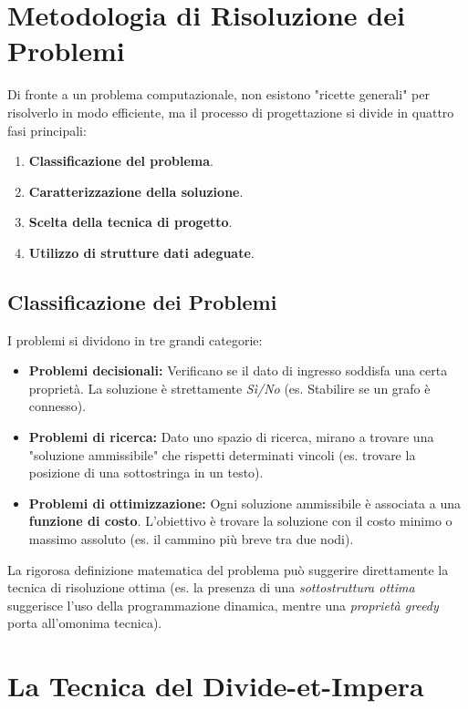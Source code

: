 \documentclass[12pt, a4paper]{article}
\begin{document}
\section{Metodologia di Risoluzione dei Problemi}

Di fronte a un problema computazionale, non esistono "ricette generali" per risolverlo in modo efficiente, ma il processo di progettazione si divide in quattro fasi principali:
\begin{enumerate}
\item \textbf{Classificazione del problema}.
\item \textbf{Caratterizzazione della soluzione}.
\item \textbf{Scelta della tecnica di progetto}.
\item \textbf{Utilizzo di strutture dati adeguate}.
\end{enumerate}

\subsection{Classificazione dei Problemi}
I problemi si dividono in tre grandi categorie:
\begin{itemize}
\item \textbf{Problemi decisionali:} Verificano se il dato di ingresso soddisfa una certa proprietà. La soluzione è strettamente \textit{Sì/No} (es. Stabilire se un grafo è connesso).
\item \textbf{Problemi di ricerca:} Dato uno spazio di ricerca, mirano a trovare una "soluzione ammissibile" che rispetti determinati vincoli (es. trovare la posizione di una sottostringa in un testo).
\item \textbf{Problemi di ottimizzazione:} Ogni soluzione ammissibile è associata a una \textbf{funzione di costo}. L'obiettivo è trovare la soluzione con il costo minimo o massimo assoluto (es. il cammino più breve tra due nodi).
\end{itemize}

La rigorosa definizione matematica del problema può suggerire direttamente la tecnica di risoluzione ottima (es. la presenza di una \textit{sottostruttura ottima} suggerisce l'uso della programmazione dinamica, mentre una \textit{proprietà greedy} porta all'omonima tecnica).

\newpage

\section{La Tecnica del Divide-et-Impera}
\end{document}
